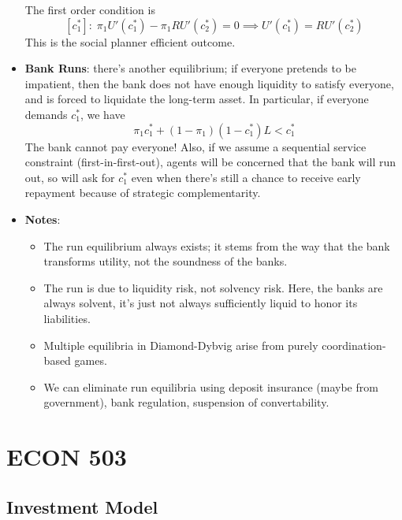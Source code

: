 \documentclass[12pt]{article}
\begin{document}
\begin{itemize}
    The first order condition is
    \[[c_1^*]:\; \pi_1U'(c_1^*) -\pi_1 RU'(c_2^*) = 0 \implies U'(c_1^*) = RU'(c_2^*)\]
    This is the social planner efficient outcome. 
    \item \textbf{Bank Runs}: there's another equilibrium; if everyone pretends to be impatient, then the bank does not have enough liquidity to satisfy everyone, and is forced to liquidate the long-term asset. In particular, if everyone demands $c_1^*$, we have
    \[\pi_1c_1^* + (1-\pi_1)(1-c_1^*)L < c_1^*\]
    The bank cannot pay everyone! Also, if we assume a sequential service constraint (first-in-first-out), agents will be concerned that the bank will run out, so will ask for $c_1^*$ even when there's still a chance to receive early repayment because of strategic complementarity. 
    \item \textbf{Notes}:
    \begin{itemize}
        \item The run equilibrium always exists; it stems from the way that the bank transforms utility, not the soundness of the banks.
        \item The run is due to liquidity risk, not solvency risk. Here, the banks are always solvent, it's just not always sufficiently liquid to honor its liabilities.
        \item Multiple equilibria in Diamond-Dybvig arise from purely coordination-based games.
        \item We can eliminate run equilibria using deposit insurance (maybe from government), bank regulation, suspension of convertability.
    \end{itemize}
\end{itemize}

\section{ECON 503}

\subsection{Investment Model}
\end{document}
